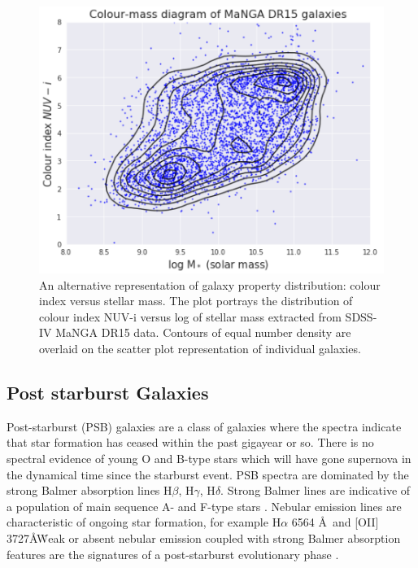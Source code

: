 \begin{figure}
    \centering
    \includegraphics[width=\columnwidth]{images/CMDs/Colour-Mass-DR15-All.png}
    \caption[Colour-mass diagram of the complete MaNGA DR15 galaxy population]{An alternative representation of galaxy property distribution: colour index versus stellar mass. The plot portrays the distribution of colour index NUV-i versus log of stellar mass extracted from SDSS-IV MaNGA DR15 data. Contours of equal number density are overlaid on the scatter plot representation of individual galaxies.}
    \label{fig:CMD-mass-1}
\end{figure}

\subsection{Post starburst Galaxies}
\label{post-starburst-galaxies}
Post-starburst (PSB) galaxies are a class of galaxies where the spectra indicate that star formation has ceased within the past gigayear or so. There is no spectral evidence of young O and B-type stars which will have gone supernova in the dynamical time since the starburst event. PSB spectra are dominated by the strong Balmer absorption lines H$\beta$, H$\gamma$, H$\delta$. Strong Balmer lines are indicative of a population of main sequence A- and F-type stars \citep{1997A&A...325.1025P}. Nebular emission lines are characteristic of ongoing star formation, for example H$\alpha$ 6564 \AA\ and [OII] 3727\AA\. Weak or absent nebular emission coupled with strong Balmer absorption features are the signatures of a post-starburst evolutionary phase \citep{2001ApJ...547L..17B,2003PASJ...55..771G,2004MNRAS.355..713B,2005MNRAS.357..937G,2018MNRAS.477.1708P}. 


